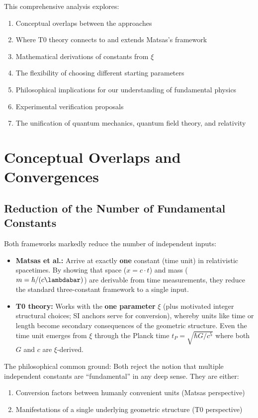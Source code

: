 	This comprehensive analysis explores:
	\begin{enumerate}
		\item Conceptual overlaps between the approaches
		\item Where T0 theory connects to and extends Matsas's framework
		\item Mathematical derivations of constants from $\xi$
		\item The flexibility of choosing different starting parameters
		\item Philosophical implications for our understanding of fundamental physics
		\item Experimental verification proposals
		\item The unification of quantum mechanics, quantum field theory, and relativity
	\end{enumerate}
	
	\section{Conceptual Overlaps and Convergences}
	
	\subsection{Reduction of the Number of Fundamental Constants}
	
	Both frameworks markedly reduce the number of independent inputs:
	
\begin{itemize}
	\item \textbf{Matsas et al.:} Arrive at exactly \textbf{one} constant (time unit) in relativistic spacetimes. By showing that space ($x = c \cdot t$) and mass ($m = \hbar / (c \lambdabar)$) are derivable from time measurements, they reduce the standard three-constant framework to a single input.
	
	\item \textbf{T0 theory:} Works with the \textbf{one parameter} $\xi$ (plus motivated integer structural choices; SI anchors serve for conversion), whereby units like time or length become secondary consequences of the geometric structure. Even the time unit emerges from $\xi$ through the Planck time $t_P = \sqrt{\hbar G/c^5}$ where both $G$ and $c$ are $\xi$-derived.
\end{itemize}
	
	The philosophical common ground: Both reject the notion that multiple independent constants are ``fundamental'' in any deep sense. They are either:
	\begin{enumerate}
		\item Conversion factors between humanly convenient units (Matsas perspective)
		\item Manifestations of a single underlying geometric structure (T0 perspective)
	\end{enumerate}
	
